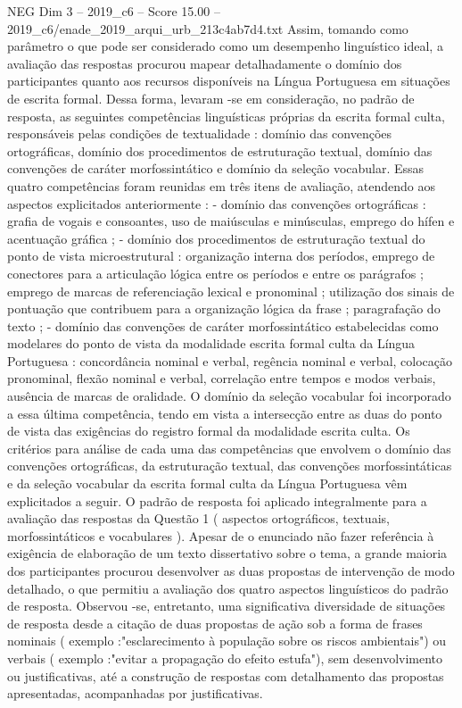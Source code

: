 \begin{textsample}{NEG Dim 3 – 2019\_c6 – Score 15.00 – 2019\_c6/enade\_2019\_arqui\_urb\_213c4ab7d4.txt}
Assim, tomando como parâmetro o que pode ser considerado como um desempenho linguístico ideal, a avaliação das respostas procurou mapear detalhadamente o domínio dos participantes quanto aos recursos disponíveis na Língua Portuguesa em situações de escrita formal.
Dessa forma, levaram -se em consideração, no padrão de resposta, as seguintes competências linguísticas próprias da escrita formal culta, responsáveis pelas condições de textualidade : domínio das convenções ortográficas, domínio dos procedimentos de estruturação textual, domínio das convenções de caráter morfossintático e domínio da seleção vocabular.
Essas quatro competências foram reunidas em três itens de avaliação, atendendo aos aspectos explicitados anteriormente : - domínio das convenções ortográficas : grafia de vogais e consoantes, uso de maiúsculas e minúsculas, emprego do hífen e acentuação gráfica ; - domínio dos procedimentos de estruturação textual do ponto de vista microestrutural : organização interna dos períodos, emprego de conectores para a articulação lógica entre os períodos e entre os parágrafos ; emprego de marcas de referenciação lexical e pronominal ; utilização dos sinais de pontuação que contribuem para a organização lógica da frase ; paragrafação do texto ; - domínio das convenções de caráter morfossintático estabelecidas como modelares do ponto de vista da modalidade escrita formal culta da Língua Portuguesa : concordância nominal e verbal, regência nominal e verbal, colocação pronominal, flexão nominal e verbal, correlação entre tempos e modos verbais, ausência de marcas de oralidade.
O domínio da seleção vocabular foi incorporado a essa última competência, tendo em vista a intersecção entre as duas do ponto de vista das exigências do registro formal da modalidade escrita culta.
Os critérios para análise de cada uma das competências que envolvem o domínio das convenções ortográficas, da estruturação textual, das convenções morfossintáticas e da seleção vocabular da escrita formal culta da Língua Portuguesa vêm explicitados a seguir.
O padrão de resposta foi aplicado integralmente para a avaliação das respostas da Questão 1 ( aspectos ortográficos, textuais, morfossintáticos e vocabulares ).
Apesar de o enunciado não fazer referência à exigência de elaboração de um texto dissertativo sobre o tema, a grande maioria dos participantes procurou desenvolver as duas propostas de intervenção de modo detalhado, o que permitiu a avaliação dos quatro aspectos linguísticos do padrão de resposta.
Observou -se, entretanto, uma significativa diversidade de situações de resposta desde a citação de duas propostas de ação sob a forma de frases nominais ( exemplo :"esclarecimento à população sobre os riscos ambientais") ou verbais ( exemplo :"evitar a propagação do efeito estufa"), sem desenvolvimento ou justificativas, até a construção de respostas com detalhamento das propostas apresentadas, acompanhadas por justificativas.

\end{textsample}
